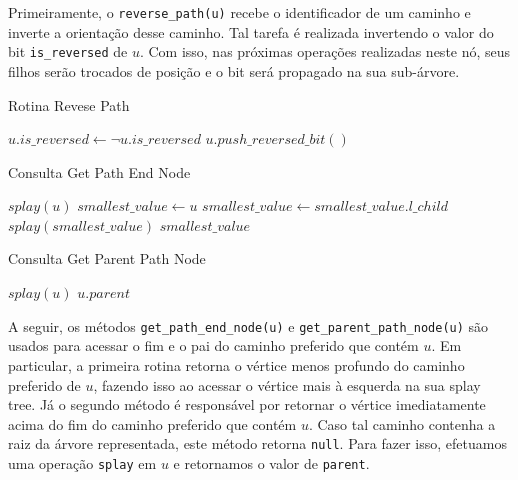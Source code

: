 Primeiramente, o \texttt{reverse\_path(u)} recebe o identificador de um caminho e inverte a orientação desse caminho. Tal tarefa é realizada invertendo o valor do bit \texttt{is\_reversed} de $u$. Com isso, nas próximas operações realizadas neste nó, seus filhos serão trocados de posição e o bit será propagado na sua sub-árvore.

\begin{algorithm}[h!]
    \caption{Rotina Revese Path}\label{splay:reverse-path}
    \begin{algorithmic}
        \State $u.is\_reversed \gets \neg u.is\_reversed$
        \State $u.push\_reversed\_bit()$ 
        \EndFunction
    \end{algorithmic}
\end{algorithm}

\begin{algorithm}[h!]
    \caption{Consulta Get Path End Node}\label{splay:get-path-end}
    \begin{algorithmic}
        \State $splay(u)$
        \State $smallest\_value \gets u$
        \State $smallest\_value \gets smallest\_value.l\_child$
        \EndWhile
        \State $splay(smallest\_value)$
        \State \Return $smallest\_value$
        \EndFunction
    \end{algorithmic}
\end{algorithm}

\begin{algorithm}[h!]
    \caption{Consulta Get Parent Path Node}\label{splay:get-parent-path}
    \begin{algorithmic}
        \State $splay(u)$
        \State \Return $u.parent$
        \EndFunction
    \end{algorithmic}
\end{algorithm}

A seguir, os métodos \texttt{get\_path\_end\_node(u)} e \texttt{get\_parent\_path\_node(u)} são usados para acessar o fim e o pai do caminho preferido que contém $u$. Em particular, a primeira rotina retorna o vértice menos profundo do caminho preferido de $u$, fazendo isso ao acessar o vértice mais à esquerda na sua splay tree. Já o segundo método é responsável por retornar o vértice imediatamente acima do fim do caminho preferido que contém $u$. Caso tal caminho contenha a raiz da árvore representada, este método retorna \texttt{null}. Para fazer isso, efetuamos uma operação \texttt{splay} em $u$ e retornamos o valor de \texttt{parent}.


